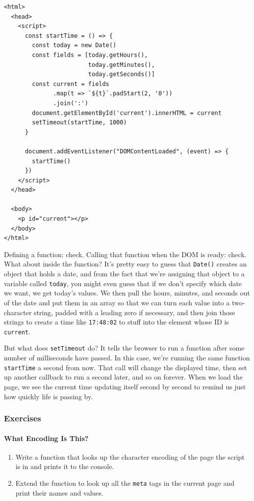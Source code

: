 \begin{verbatim}
<html>
  <head>
    <script>
      const startTime = () => {
        const today = new Date()
        const fields = [today.getHours(),
                        today.getMinutes(),
                        today.getSeconds()]
        const current = fields
              .map(t => `${t}`.padStart(2, '0'))
              .join(':')
        document.getElementById('current').innerHTML = current
        setTimeout(startTime, 1000)
      }

      document.addEventListener("DOMContentLoaded", (event) => {
        startTime()
      })
    </script>
  </head>

  <body>
    <p id="current"></p>
  </body>
</html>
\end{verbatim}

Defining a function: check. Calling that function when the DOM is ready:
check. What about inside the function? It's pretty easy to guess that
\texttt{Date()} creates an object that holds a date, and from the fact
that we're assigning that object to a variable called \texttt{today},
you might even guess that if we don't specify which date we want, we get
today's values. We then pull the hours, minutes, and seconds out of the
date and put them in an array so that we can turn each value into a
two-character string, padded with a leading zero if necessary, and then
join those strings to create a time like \texttt{17:48:02} to stuff into
the element whose ID is \texttt{current}.

But what does \texttt{setTimeout} do? It tells the browser to run a
function after some number of milliseconds have passed. In this case,
we're running the same function \texttt{startTime} a second from now.
That call will change the displayed time, then set up another callback
to run a second later, and so on forever. When we load the page, we see
the current time updating itself second by second to remind us just how
quickly life is passing by.

\subsubsection{Exercises}\label{s:pages-exercises}

\paragraph{What Encoding Is This?}\label{what-encoding-is-this}

\begin{enumerate}
\tightlist
\item
  Write a function that looks up the character encoding of the page the
  script is in and prints it to the console.
\item
  Extend the function to look up all the \texttt{meta} tags in the
  current page and print their names and values.
\end{enumerate}

